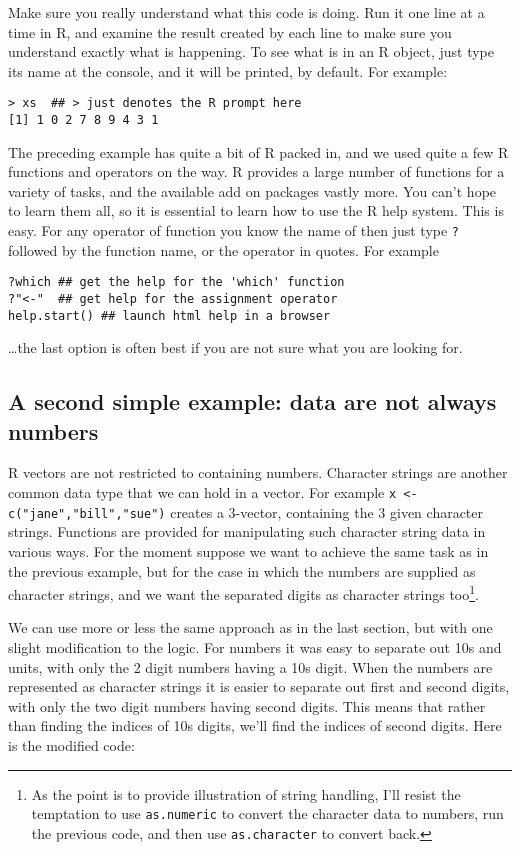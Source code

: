 \documentclass[10pt] {article}
\theoremstyle{definition}
\begin{document}
Make sure you really understand what this code is doing. Run it one line at a time in R, and examine the result created by each line to make sure you understand exactly what is happening. To see what is in an R object, just type its name at the console, and it will be printed, by default. For example:
\begin{verbatim}
> xs  ## > just denotes the R prompt here
[1] 1 0 2 7 8 9 4 3 1
\end{verbatim}

The preceding example has quite a bit of R packed in, and we used quite a few R functions and operators on the way. R provides a large number of functions for a variety of tasks, and the available add on packages vastly more. You can't hope to learn them all, so it is essential to learn how to use the R help system. This is easy. For any operator of function you know the name of then just type \verb+?+ followed by the function name, or the operator in quotes. For example
\begin{verbatim}
?which ## get the help for the 'which' function
?"<-"  ## get help for the assignment operator
help.start() ## launch html help in a browser
\end{verbatim}  
\ldots the last option is often best if you are not sure what you are looking for.

\subsection{A second simple example: data are not always numbers}

R vectors are not restricted to containing numbers. Character strings are another common data type that we can hold in a vector. For example \verb+x <- c("jane","bill","sue")+ creates a 3-vector, containing the 3 given character strings. Functions are provided for manipulating such character string data in various ways. For the moment suppose we want to achieve the same task as in the previous example, but for the case in which the numbers are supplied as character strings, and we want the separated digits as character strings too\footnote{As the point is to provide illustration of string handling, I'll resist the temptation to use {\tt as.numeric} to convert the character data to numbers, run the previous code, and then use {\tt as.character} to convert back.}.  

We can use more or less the same approach as in the last section, but with one slight modification to the logic. For numbers it was easy to separate out 10s and units, with only the 2 digit numbers having a 10s digit. When the numbers are represented as character strings it is easier to separate out first and second digits, with only the two digit numbers having second digits. This means that rather than finding the indices of 10s digits, we'll find the indices of second digits. Here is the modified code:
\end{document}
